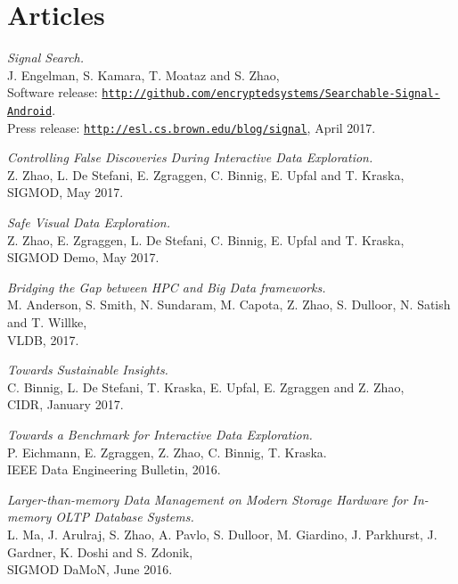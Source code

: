 \documentclass[letterpaper]{article}
\renewenvironment{itemize}{
  \begin{list}{}{
    \setlength{\leftmargin}{1.5em}
  }
}{
  \end{list}
}
\begin{document}
\section*{Articles}

\begin{itemize}

\item \textit{Signal Search.} \\
  J. Engelman, S. Kamara, T. Moataz and S. Zhao, \\
  Software release: \href{http://github.com/encryptedsystems/Searchable-Signal-Android}{\tt http://github.com/encryptedsystems/Searchable-Signal-Android}. \\
  Press release: \href{http://esl.cs.brown.edu/blog/signal}{\tt http://esl.cs.brown.edu/blog/signal}, April 2017.

\item \textit{Controlling False Discoveries During Interactive Data Exploration.} \\
  Z. Zhao, L. De Stefani, E. Zgraggen, C. Binnig, E. Upfal and T. Kraska, \\
  SIGMOD, May 2017.

\item \textit{Safe Visual Data Exploration.} \\
  Z. Zhao, E. Zgraggen, L. De Stefani, C. Binnig, E. Upfal and T. Kraska, \\
  SIGMOD Demo, May 2017.

\item \textit{Bridging the Gap between HPC and Big Data frameworks.} \\
  M. Anderson, S. Smith, N. Sundaram, M. Capota, Z. Zhao, S. Dulloor, N. Satish and T. Willke, \\
  VLDB, 2017.

\item \textit{Towards Sustainable Insights.} \\
  C. Binnig, L. De Stefani, T. Kraska, E. Upfal, E. Zgraggen and Z. Zhao, \\
  CIDR, January 2017.

\item \textit{Towards a Benchmark for Interactive Data Exploration.} \\
  P. Eichmann, E. Zgraggen, Z. Zhao, C. Binnig, T. Kraska. \\
   IEEE Data Engineering Bulletin, 2016.

\item \textit{Larger-than-memory Data Management on Modern Storage Hardware for In-memory OLTP Database Systems.} \\
  L. Ma, J. Arulraj, S. Zhao, A. Pavlo, S. Dulloor, M. Giardino, J. Parkhurst, J. Gardner, K. Doshi and S. Zdonik, \\
  SIGMOD DaMoN, June 2016.


\end{itemize}
\end{document}
